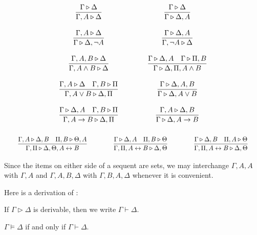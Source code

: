 \documentclass{article}
\begin{document}
\[ \arraycolsep = 2em \def\arraystretch{3}
\begin{array}{c c}
\sequentrule{\Gamma}{\Delta}{\Gamma, A}{\Delta} &
\sequentrule{\Gamma}{\Delta}{\Gamma}{\Delta, A} \\
\sequentrule{\Gamma, A}{\Delta}{\Gamma}{\Delta, \neg A} &
\sequentrule{\Gamma}{\Delta, A}{\Gamma, \neg A}{\Delta} \\
\sequentrule{\Gamma, A, B}{\Delta}{\Gamma, A \wedge B}{\Delta} &
\doublesequentrule{\Gamma}{\Delta, A}{\Gamma}{\Pi, B}{\Gamma}{\Delta, \Pi, A \wedge B} \\
\doublesequentrule{\Gamma, A}{\Delta}{\Gamma, B}{\Pi}{\Gamma, A \vee B}{\Delta, \Pi} & 
\sequentrule{\Gamma}{\Delta, A, B}{\Gamma}{\Delta, A \vee B} \\
\doublesequentrule{\Gamma}{\Delta, A}{\Gamma, B}{\Pi}{\Gamma, A \to B}{\Delta, \Pi} &
\sequentrule{\Gamma, A}{\Delta, B}{\Gamma}{\Delta, A \to B}
\end{array}
\]
\vspace{-1em}
\[ \arraycolsep = 2em \def\arraystretch{3}
\begin{array}{c c c}
\doublesequentrule{\Gamma, A}{\Delta, B}{\Pi, B}{\Theta, A}{\Gamma, \Pi}{\Delta, \Theta, A \iff B} &
\doublesequentrule{\Gamma}{\Delta, A}{\Pi, B}{\Theta}{\Gamma, \Pi, A \iff B}{\Delta, \Theta} &
\doublesequentrule{\Gamma}{\Delta, B}{\Pi, A}{\Theta}{\Gamma, \Pi, A \iff B}{\Delta, \Theta}
\end{array}
\]




\begin{proposition}
    Since the items on either side of a sequent are sets, we may interchange $\Gamma, A, A$ with $\Gamma, A$ and $\Gamma, A, B, \Delta$ with $\Gamma, B, A, \Delta$ whenever it is convenient.
\end{proposition}

Here is a derivation of :

\begin{prooftree}
\end{prooftree}

\begin{notation}
    If $\Gamma \triangleright \Delta$ is derivable, then we write $\Gamma \vdash \Delta$.
\end{notation}

\begin{proposition}
    $\Gamma \models \Delta$ if and only if $\Gamma \vdash \Delta$.
\end{proposition}
\end{document}
